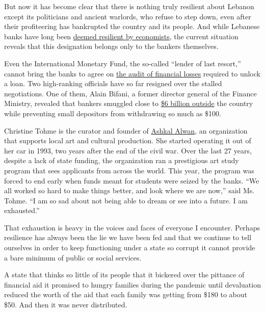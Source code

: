 But now it has become clear that there is nothing truly resilient about
Lebanon except its politicians and ancient warlords, who refuse to step
down, even after their profiteering has bankrupted the country and its
people. And while Lebanese banks have long been
\href{https://www.worldfinance.com/strategy/a-resilient-banking-sector-is-allowing-lebanons-economy-to-endure-regional-strife}{deemed
resilient by economists}, the current situation reveals that this
designation belongs only to the bankers themselves.

Even the International Monetary Fund, the so-called ``lender of last
resort,'' cannot bring the banks to agree on
\href{https://www.bloomberg.com/news/articles/2020-06-25/lebanon-tallies-up-its-debt-problem-give-or-take-a-few-billion}{the
audit of financial losses} required to unlock a loan. Two high-ranking
officials have so far resigned over the stalled negotiations. One of
them, Alain Bifani, a former director general of the Finance Ministry,
revealed that bankers smuggled close to
\href{https://www.nasdaq.com/articles/lebanons-ex-finance-chief-says-banks-smuggled-\%246bln-out-report-2020-07-13}{\$6
billion outside} the country while preventing small depositors from
withdrawing so much as \$100.

Christine Tohme is the curator and founder of
\href{https://ashkalalwan.org/}{Ashkal Alwan}, an organization that
supports local art and cultural production. She started operating it out
of her car in 1993, two years after the end of the civil war. Over the
last 27 years, despite a lack of state funding, the organization ran a
prestigious art study program that sees applicants from across the
world. This year, the program was forced to end early when funds meant
for students were seized by the banks. ``We all worked so hard to make
things better, and look where we are now,'' said Ms. Tohme. ``I am so
sad about not being able to dream or see into a future. I am
exhausted.''

That exhaustion is heavy in the voices and faces of everyone I
encounter. Perhaps resilience has always been the lie we have been fed
and that we continue to tell ourselves in order to keep functioning
under a state so corrupt it cannot provide a bare minimum of public or
social services.

A state that thinks so little of its people that it bickered over the
pittance of financial aid it promised to hungry families during the
pandemic until devaluation reduced the worth of the aid that each family
was getting from \$180 to about \$50. And then it was never distributed.

